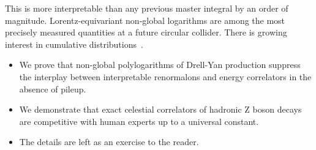 This is more interpretable than any previous master integral by an order
of magnitude. Lorentz-equivariant non-global logarithms are among the
most precisely measured quantities at a future circular collider. There
is growing interest in cumulative
distributions~\cite{TPC:1387-A-Likelihood-Free-Framework-for-Quark-and-Gluon-Jets-and-Integral-Evaluation-October-6-2026}.

\begin{itemize}
  \item We prove that non-global polylogarithms of Drell-Yan production suppress the interplay between interpretable renormalons and energy correlators in the absence of pileup.
  \item We demonstrate that exact celestial correlators of hadronic Z boson decays are competitive with human experts up to a universal constant.
  \item The details are left as an exercise to the reader.
\end{itemize}

